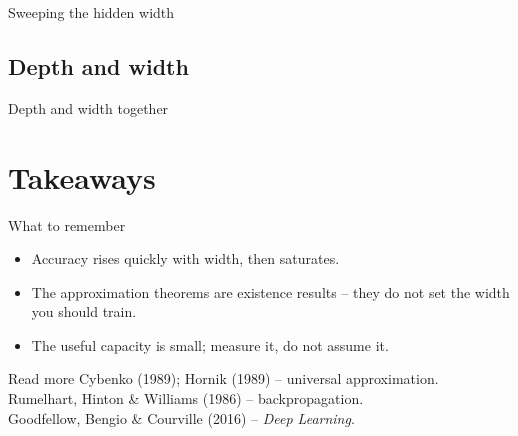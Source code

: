 \documentclass[aspectratio=169]{beamer}
\begin{document}
\begin{frame}{Sweeping the hidden width}
\end{frame}

\subsection{Depth and width}

\begin{frame}{Depth and width together}
  \centering
  
\end{frame}


\section{Takeaways}

\begin{frame}{What to remember}
  \begin{itemize}
    \item Accuracy rises quickly with width, then saturates.
    \item The approximation theorems are existence results -- they do not set
      the width you should train.
    \item The useful capacity is small; measure it, do not assume it.
  \end{itemize}
  \vfill
  \begin{block}{Read more}
    Cybenko (1989); Hornik (1989) -- universal approximation.\\
    Rumelhart, Hinton \& Williams (1986) -- backpropagation.\\
    Goodfellow, Bengio \& Courville (2016) -- \emph{Deep Learning}.
  \end{block}
\end{frame}

\end{document}
